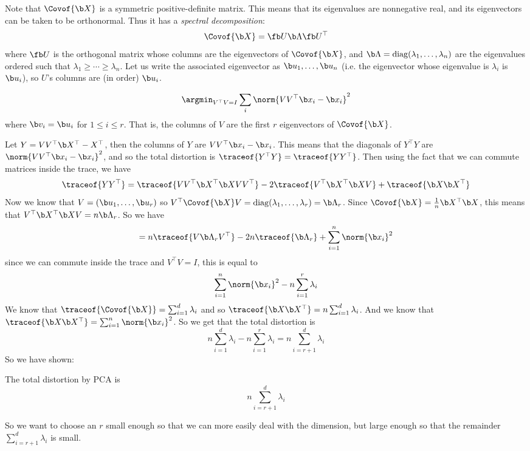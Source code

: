 Note that $\Covof{\b X}$ is a symmetric positive-definite matrix.
This means that its eigenvalues are nonnegative real, and its eigenvectors can be taken to be orthonormal.
Thus it has a {\it spectral decomposition}:
$$ \Covof{\b X} = \fb U\b\Lambda\fb U^\top $$
where $\fb U$ is the orthogonal matrix whose columns are the eigenvectors of $\Covof{\b X}$, and $\b\Lambda={\rm diag}(\lambda_1,\dots,\lambda_n)$ are the eigenvalues ordered such that
$\lambda_1\geq\cdots\geq\lambda_n$.
Let us write the associated eigenvector as $\b u_1,\dots,\b u_n$ (i.e. the eigenvector whose eigenvalue is $\lambda_i$ is $\b u_i$), so $U$'s columns are (in order) $\b u_i$.

\bthrm[title=PCA Solution]

    $$ \argmin_{V^\top V=I}\sum_i\norm{VV^\top\b x_i-\b x_i}^2 $$
    where $\b v_i=\b u_i$ for $1\leq i\leq r$.
    That is, the columns of $V$ are the first $r$ eigenvectors of $\Covof{\b X}$.

\ethrm

Let $Y=VV^\top\b X^\top-X^\top$, then the columns of $Y$ are $VV^\top\b x_i-\b x_i$.
This means that the diagonals of $Y^\top Y$ are $\norm{VV^\top\b x_i-\b x_i}^2$, and so the total distortion is $\traceof{Y^\top Y}=\traceof{YY^\top}$.
Then using the fact that we can commute matrices inside the trace, we have
$$ \traceof{YY^\top} = \traceof{VV^\top\b X^\top\b XVV^\top} - 2\traceof{V^\top\b X^\top\b XV} + \traceof{\b X\b X^\top} $$
Now we know that $V=(\b u_1,\dots,\b u_r)$ so $V^\top\Covof{\b X}V={\rm diag}(\lambda_1,\dots,\lambda_r)=\b\Lambda_r$.
Since $\Covof{\b X}=\frac1n\b X^\top\b X$, this means that $V^\top\b X^\top\b XV=n\b\Lambda_r$.
So we have
$$ = n\traceof{V\b\Lambda_rV^\top} - 2n\traceof{\b\Lambda_r} + \sum_{i=1}^n\norm{\b x_i}^2 $$
since we can commute inside the trace and $V^\top V=I$, this is equal to
$$ \sum_{i=1}^n\norm{\b x_i}^2 - n\sum_{i=1}^r\lambda_i $$
We know that $\traceof{\Covof{\b X}}=\sum_{i=1}^d\lambda_i$ and so $\traceof{\b X\b X^\top}=n\sum_{i=1}^d\lambda_i$.
And we know that $\traceof{\b X\b X^\top}=\sum_{i=1}^n\norm{\b x_i}^2$.
So we get that the total distortion is
$$ n\sum_{i=1}^d\lambda_i - n\sum_{i=1}^r\lambda_i = n\sum_{i=r+1}^d\lambda_i $$
So we have shown:

\bprop

    The total distortion by PCA is
    $$ n\sum_{i=r+1}^d\lambda_i $$

\eprop

So we want to choose an $r$ small enough so that we can more easily deal with the dimension, but large enough so that the remainder $\sum_{i=r+1}^d\lambda_i$ is small.

